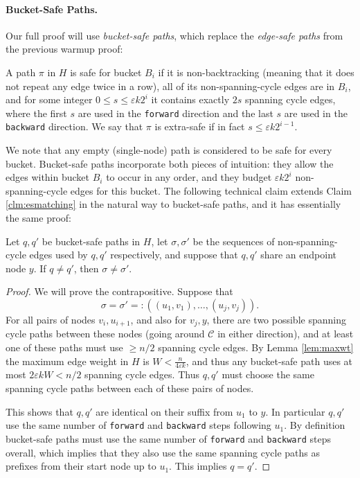 \documentclass{article}\usepackage[a4paper,margin=20mm]{geometry}
\newcommand{\eps}{\varepsilon}
\newcommand{\cee}{\mathcal{C}}
\newcommand{\forward}{\texttt{forward}}
\newcommand{\backward}{\texttt{backward}}
\begin{document}
\paragraph{Bucket-Safe Paths.}

Our full proof will use \emph{bucket-safe paths}, which replace the \emph{edge-safe paths} from the previous warmup proof:

\begin{definition} 
A path $\pi$ in $H$ is safe for bucket $B_i$ if it is non-backtracking (meaning that it does not repeat any edge twice in a row), all of its non-spanning-cycle edges are in $B_i$, and for some integer $0 \le s \le \eps k 2^i$ it contains exactly $2s$ spanning cycle edges, where the first $s$ are used in the \forward{} direction and the last $s$ are used in the \backward{} direction.
We say that $\pi$ is extra-safe if in fact $s \le \eps k 2^{i-1}$.
\end{definition}

We note that any empty (single-node) path is considered to be safe for every bucket.
Bucket-safe paths incorporate both pieces of intuition: they allow the edges within bucket $B_i$ to occur in any order, and they budget $\eps k 2^i$ non-spanning-cycle edges for this bucket.
The following technical claim extends Claim \ref{clm:esmatching} in the natural way to bucket-safe paths, and it has essentially the same proof:
\begin{claim} \label{clm:bsmatching}
Let $q, q'$ be bucket-safe paths in $H$, let $\sigma, \sigma'$ be the sequences of non-spanning-cycle edges used by $q, q'$ respectively, and suppose that $q, q'$ share an endpoint node $y$.
If $q \ne q'$, then $\sigma \ne \sigma'$.
\end{claim}
\begin{proof}
We will prove the contrapositive.
Suppose that
$$\sigma = \sigma' =: \left((u_1, v_1), \dots, (u_j, v_j)\right).$$
For all pairs of nodes $v_i, u_{i+1}$, and also for $v_j, y$, there are two possible spanning cycle paths between these nodes (going around $\cee$ in either direction), and at least one of these paths must use $\ge n/2$ spanning cycle edges.
By Lemma \ref{lem:maxwt} the maximum edge weight in $H$ is $W < \frac{n}{4 \eps k}$, and thus any bucket-safe path uses at most $2 \eps k W < n/2$ spanning cycle edges.
Thus $q, q'$ must choose the same spanning cycle paths between each of these pairs of nodes.

This shows that $q, q'$ are identical on their suffix from $u_1$ to $y$.
In particular $q, q'$ use the same number of \forward{} and \backward{} steps following $u_1$.
By definition bucket-safe paths must use the same number of \forward{} and \backward{} steps overall, which implies that they also use the same spanning cycle paths as prefixes from their start node up to $u_1$. This implies $q=q'$.
\end{proof}
\end{document}
